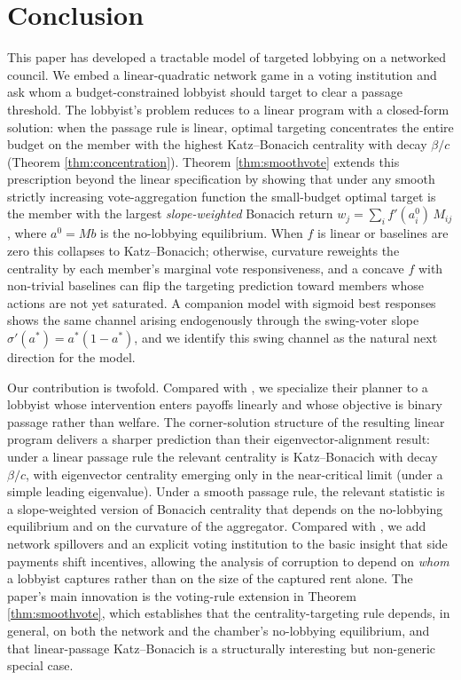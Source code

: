 \documentclass[11pt,letterpaper]{article}
\theoremstyle{plain}
\theoremstyle{definition}
\theoremstyle{remark}
\begin{document}

\section{Conclusion}
\label{sec:conclusion}

This paper has developed a tractable model of targeted lobbying on a networked council. We embed a linear-quadratic network game in a voting institution and ask whom a budget-constrained lobbyist should target to clear a passage threshold. The lobbyist's problem reduces to a linear program with a closed-form solution: when the passage rule is linear, optimal targeting concentrates the entire budget on the member with the highest Katz--Bonacich centrality with decay $\beta/c$ (Theorem \ref{thm:concentration}). Theorem \ref{thm:smoothvote} extends this prescription beyond the linear specification by showing that under any smooth strictly increasing vote-aggregation function the small-budget optimal target is the member with the largest \emph{slope-weighted} Bonacich return $w_j = \sum_i f'(a_i^0)\, M_{ij}$, where $a^0 = Mb$ is the no-lobbying equilibrium. When $f$ is linear or baselines are zero this collapses to Katz--Bonacich; otherwise, curvature reweights the centrality by each member's marginal vote responsiveness, and a concave $f$ with non-trivial baselines can flip the targeting prediction toward members whose actions are not yet saturated. A companion model with sigmoid best responses shows the same channel arising endogenously through the swing-voter slope $\sigma'(a^*) = a^*(1 - a^*)$, and we identify this swing channel as the natural next direction for the model.

Our contribution is twofold. Compared with \citet{ggg2020}, we specialize their planner to a lobbyist whose intervention enters payoffs linearly and whose objective is binary passage rather than welfare. The corner-solution structure of the resulting linear program delivers a sharper prediction than their eigenvector-alignment result: under a linear passage rule the relevant centrality is Katz--Bonacich with decay $\beta/c$, with eigenvector centrality emerging only in the near-critical limit (under a simple leading eigenvalue). Under a smooth passage rule, the relevant statistic is a slope-weighted version of Bonacich centrality that depends on the no-lobbying equilibrium and on the curvature of the aggregator. Compared with \citet{shleifer1993}, we add network spillovers and an explicit voting institution to the basic insight that side payments shift incentives, allowing the analysis of corruption to depend on \emph{whom} a lobbyist captures rather than on the size of the captured rent alone. The paper's main innovation is the voting-rule extension in Theorem \ref{thm:smoothvote}, which establishes that the centrality-targeting rule depends, in general, on both the network and the chamber's no-lobbying equilibrium, and that linear-passage Katz--Bonacich is a structurally interesting but non-generic special case.
\end{document}
